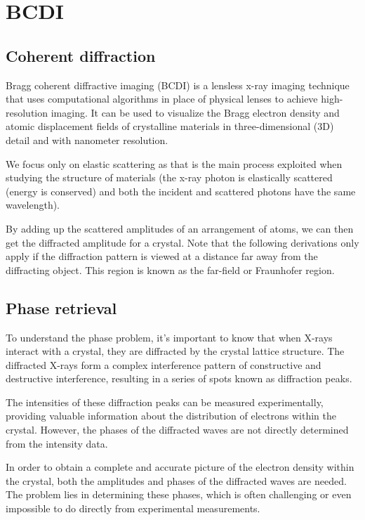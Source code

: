 \section{BCDI}

\subsection{Coherent diffraction}

Bragg coherent diffractive imaging (BCDI) is a lensless x-ray imaging technique that uses computational algorithms in place of physical lenses to achieve high-resolution imaging. It can be used to visualize the Bragg electron density and atomic displacement fields of crystalline materials in three-dimensional (3D) detail and with nanometer resolution.

We focus only on elastic scattering as that is the main process exploited when studying the structure of materials (the x-ray photon is elastically scattered (energy is conserved) and both the incident and scattered photons have the same wavelength).

By adding up the scattered amplitudes of an arrangement of atoms, we can then get the diffracted amplitude for a crystal. Note that the following derivations only apply if the diffraction pattern is viewed at a distance far away from the diffracting object. This region is known as the far-field or Fraunhofer region.

\subsection{Phase retrieval}

To understand the phase problem, it's important to know that when X-rays interact with a crystal, they are diffracted by the crystal lattice structure. The diffracted X-rays form a complex interference pattern of constructive and destructive interference, resulting in a series of spots known as diffraction peaks.

The intensities of these diffraction peaks can be measured experimentally, providing valuable information about the distribution of electrons within the crystal. However, the phases of the diffracted waves are not directly determined from the intensity data.

In order to obtain a complete and accurate picture of the electron density within the crystal, both the amplitudes and phases of the diffracted waves are needed. The problem lies in determining these phases, which is often challenging or even impossible to do directly from experimental measurements.

